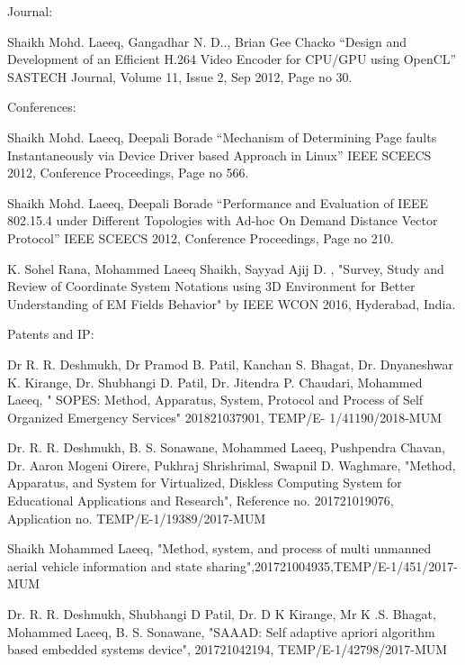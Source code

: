 \begin{cventries}
  \cventry
    {}%
    {Journal:}
    {} {}%
    {
      \begin{cvitems}
      {
        \item {Shaikh Mohd. Laeeq, Gangadhar N. D.., Brian Gee Chacko     “Design and Development of an
            Efficient H.264 Video Encoder for CPU/GPU using OpenCL” SASTECH Journal, Volume 11,
            Issue 2, Sep 2012, Page no 30.}
      }
      \end{cvitems}
    }
  \cventry
    {}
    {Conferences:}
    {} {}%
    {
      \begin{cvitems}
      {
        \item {Shaikh Mohd. Laeeq, Deepali Borade “Mechanism of Determining Page faults Instantaneously
        via Device Driver based Approach in Linux” IEEE SCEECS 2012, Conference Proceedings,
        Page no 566.}
        \item {Shaikh Mohd. Laeeq, Deepali Borade “Performance and Evaluation of IEEE 802.15.4 under
        Different Topologies with Ad-hoc On Demand Distance Vector Protocol” IEEE SCEECS 2012,
        Conference Proceedings, Page no 210.}
        \item {K. Sohel Rana, Mohammed Laeeq Shaikh, Sayyad Ajij D. , "Survey, Study and Review of
        Coordinate System Notations using 3D Environment for Better Understanding of EM Fields
        Behavior" by IEEE WCON 2016, Hyderabad, India.}
      }
      \end{cvitems}
    }
    {}%
    \cventry
    {}
    {Patents and IP:}
    {} {}%
    {
        \begin{cvitems}
        {
            \item {Dr R. R. Deshmukh, Dr Pramod B. Patil, Kanchan S. Bhagat, Dr. Dnyaneshwar K. Kirange, Dr.
            Shubhangi D. Patil, Dr. Jitendra P. Chaudari, Mohammed Laeeq, " SOPES: Method, Apparatus,
            System, Protocol and Process of Self Organized Emergency Services" 201821037901, TEMP/E-
            1/41190/2018-MUM}
            \item {Dr. R. R. Deshmukh, B. S. Sonawane, Mohammed Laeeq, Pushpendra Chavan, Dr. Aaron
            Mogeni Oirere, Pukhraj Shrishrimal, Swapnil D. Waghmare, "Method, Apparatus, and System for
            Virtualized, Diskless Computing System for Educational Applications and Research", Reference no. 201721019076, Application no. TEMP/E-1/19389/2017-MUM}
            \item {Shaikh Mohammed Laeeq, "Method, system, and process of multi unmanned aerial vehicle information and state sharing",201721004935,TEMP/E-1/451/2017-MUM}
            \item {Dr. R. R. Deshmukh, Shubhangi D Patil, Dr. D K Kirange, Mr K .S. Bhagat, Mohammed Laeeq, B. S. Sonawane, "SAAAD: Self adaptive apriori algorithm based embedded systems device", 201721042194, TEMP/E-1/42798/2017-MUM}
        }
        \end{cvitems}
    }


\end{cventries}
